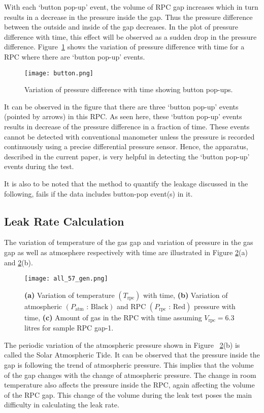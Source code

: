 With each `button pop-up' event, the volume of RPC gap increases which in turn results in a decrease in the pressure inside the gap. Thus the pressure difference between the outside and inside of the gap decreases. In the plot of pressure difference with time, this effect will be observed as a sudden drop in the pressure difference. Figure~\ref{fig:button} shows the variation of pressure difference with time for a RPC where there are `button pop-up' events. 
\begin{figure}
  \centering
  \texttt{[image: button.png]}
  \caption{Variation of pressure difference with time showing button pop-ups.}
  \label{fig:button}
\end{figure}
It can be observed in the figure that there are three `button pop-up' events (pointed by arrows) in this RPC. As seen here, these `button pop-up' events results in decrease of the pressure difference in a fraction of time. These events cannot be detected with conventional manometer unless the pressure is recorded continuously using a precise differential pressure sensor. Hence, the apparatus, described in the current paper, is very helpful in detecting the `button pop-up' events during the test.

It is also to be noted that the method to quantify the leakage discussed in the following, fails if the data includes button-pop event(s) in it.

\subsection{Leak Rate Calculation}\label{sec:calculation}
The variation of temperature of the gas gap and variation of pressure in the gas gap as well as atmosphere respectively with time are illustrated in Figure \ref{fig:temp}(a) and \ref{fig:temp}(b). 
\begin{figure}[h]
  \centering
  \texttt{[image: all\_57\_gen.png]}
  \caption{\textbf{(a)} Variation of temperature $\left(T_{\textrm{rpc}}\right)$ with time, \textbf{(b)} Variation of atmospheric $\left(P_{\textrm{atm}}\text{ : Black}\right)$ and RPC $\left(P_{\textrm{rpc}}\text{ : Red}\right)$ pressure with time, \textbf{(c)} Amount of gas in the RPC with time assuming $V_{\textrm{rpc}}=6.3$\,litres for sample RPC gap-1.}
  \label{fig:temp}
\end{figure}
The periodic variation of the atmospheric pressure shown in Figure~ \ref{fig:temp}(b) is called the Solar Atmospheric Tide. It can be observed that the pressure inside the gap is following the trend of atmospheric pressure. This implies that the volume of the gap changes with the change of atmospheric pressure. The change in room temperature also affects the pressure inside the RPC, again affecting the volume of the RPC gap. This change of the volume during the leak test poses the main difficulty in calculating the leak rate.


